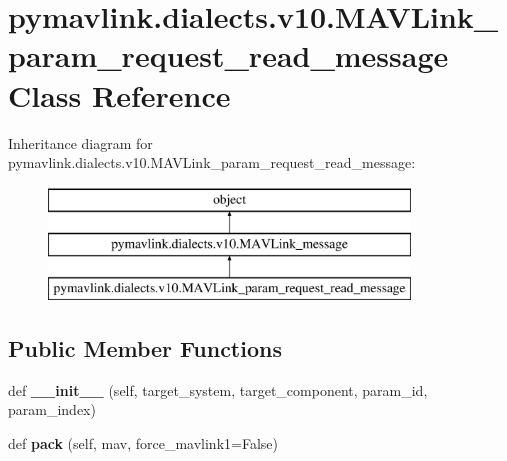 \hypertarget{classpymavlink_1_1dialects_1_1v10_1_1MAVLink__param__request__read__message}{}\section{pymavlink.\+dialects.\+v10.\+M\+A\+V\+Link\+\_\+param\+\_\+request\+\_\+read\+\_\+message Class Reference}
\label{classpymavlink_1_1dialects_1_1v10_1_1MAVLink__param__request__read__message}
Inheritance diagram for pymavlink.\+dialects.\+v10.\+M\+A\+V\+Link\+\_\+param\+\_\+request\+\_\+read\+\_\+message\+:\begin{figure}[H]
\begin{center}
\leavevmode
\includegraphics[height=3.000000cm]{classpymavlink_1_1dialects_1_1v10_1_1MAVLink__param__request__read__message}
\end{center}
\end{figure}
\subsection*{Public Member Functions}
\begin{DoxyCompactItemize}
\item 
\mbox{\label{classpymavlink_1_1dialects_1_1v10_1_1MAVLink__param__request__read__message_a6b08ea6b650a17064062b9dd0602ff9d}} 
def {\bfseries \+\_\+\+\_\+init\+\_\+\+\_\+} (self, target\+\_\+system, target\+\_\+component, param\+\_\+id, param\+\_\+index)
\item 
\mbox{\label{classpymavlink_1_1dialects_1_1v10_1_1MAVLink__param__request__read__message_afe1dd44a7852c86695e923d84e9c9b88}} 
def {\bfseries pack} (self, mav, force\+\_\+mavlink1=False)
\end{DoxyCompactItemize}
